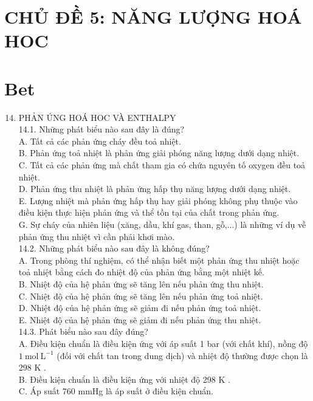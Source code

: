 \documentclass[10pt]{article}
\begin{document}
\section*{CHỦ ĐỀ 5: NĂNG LƯỢNG HOÁ HOC}
\section*{Bet}
\begin{enumerate}
  \setcounter{enumi}{13}
  \item PHẢN ÚNG HOÁ HOC VÀ ENTHALPY\\
14.1. Những phát biểu nào sau đây là đúng?\\
A. Tất cả các phản ứng cháy đều toả nhiệt.\\
B. Phản ứng toả nhiệt là phản ứng giải phóng năng lượng dưới dạng nhiệt.\\
C. Tất cả các phản ứng mà chất tham gia có chứa nguyên tố oxygen đều toả nhiệt.\\
D. Phản ứng thu nhiệt là phản ứng hấp thụ năng lượng dưới dạng nhiệt.\\
E. Lượng nhiệt mà phản ứng hấp thụ hay giải phóng không phụ thuộc vào điều kiện thực hiện phản ứng và thể tồn tại của chất trong phản ứng.\\
G. Sự cháy của nhiên liệu (xăng, dầu, khí gas, than, gỗ,...) là những ví dụ về phản ứng thu nhiệt vì cần phải khơi mào.\\
14.2. Những phát biểu nào sau đây là không đúng?\\
A. Trong phòng thí nghiệm, có thể nhận biết một phản ứng thu nhiệt hoặc toả nhiệt bằng cách đo nhiệt độ của phản ứng bằng một nhiệt kế.\\
B. Nhiệt độ của hệ phản ứng sẽ tăng lên nếu phản ứng thu nhiệt.\\
C. Nhiệt độ của hệ phản ứng sẽ tăng lên nếu phản ứng toả nhiệt.\\
D. Nhiệt độ của hệ phản ứng sẽ giảm đi nếu phản ứng toả nhiệt.\\
E. Nhiệt độ của hệ phản ứng sẽ giảm đi nếu phản ứng thu nhiệt.\\
14.3. Phát biểu nào sau đây đúng?\\
A. Điều kiện chuẩn là điều kiện ứng với áp suất 1 bar (với chất khí), nồng độ $1 \mathrm{~mol} \mathrm{~L}^{-1}$ (đối với chất tan trong dung dịch) và nhiệt độ thường được chọn là 298 K .\\
B. Điều kiện chuẩn là điều kiện ứng với nhiệt độ 298 K .\\
C. Áp suất 760 mmHg là áp suất ở điều kiện chuẩn.\\

\end{enumerate}
\end{document}
